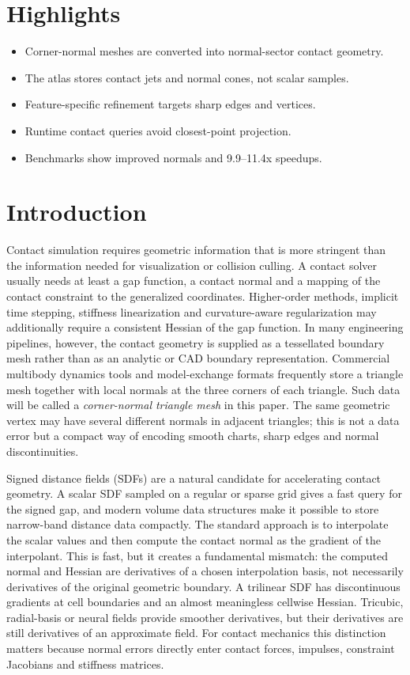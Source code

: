 \documentclass[preprint,12pt,sort&compress]{elsarticle}
\begin{document}
\section*{Highlights}
\begin{itemize}[leftmargin=1.5em]
\item Corner-normal meshes are converted into normal-sector contact geometry.
\item The atlas stores contact jets and normal cones, not scalar samples.
\item Feature-specific refinement targets sharp edges and vertices.
\item Runtime contact queries avoid closest-point projection.
\item Benchmarks show improved normals and 9.9--11.4x speedups.
\end{itemize}

\section{Introduction}
\label{sec:introduction}

Contact simulation requires geometric information that is more stringent than the information needed for visualization or collision culling. A contact solver usually needs at least a gap function, a contact normal and a mapping of the contact constraint to the generalized coordinates. Higher-order methods, implicit time stepping, stiffness linearization and curvature-aware regularization may additionally require a consistent Hessian of the gap function. In many engineering pipelines, however, the contact geometry is supplied as a tessellated boundary mesh rather than as an analytic or CAD boundary representation. Commercial multibody dynamics tools and model-exchange formats frequently store a triangle mesh together with local normals at the three corners of each triangle. Such data will be called a \emph{corner-normal triangle mesh} in this paper. The same geometric vertex may have several different normals in adjacent triangles; this is not a data error but a compact way of encoding smooth charts, sharp edges and normal discontinuities.

Signed distance fields (SDFs) are a natural candidate for accelerating contact geometry. A scalar SDF sampled on a regular or sparse grid gives a fast query for the signed gap, and modern volume data structures make it possible to store narrow-band distance data compactly. The standard approach is to interpolate the scalar values and then compute the contact normal as the gradient of the interpolant. This is fast, but it creates a fundamental mismatch: the computed normal and Hessian are derivatives of a chosen interpolation basis, not necessarily derivatives of the original geometric boundary. A trilinear SDF has discontinuous gradients at cell boundaries and an almost meaningless cellwise Hessian. Tricubic, radial-basis or neural fields provide smoother derivatives, but their derivatives are still derivatives of an approximate field. For contact mechanics this distinction matters because normal errors directly enter contact forces, impulses, constraint Jacobians and stiffness matrices.
\end{document}
